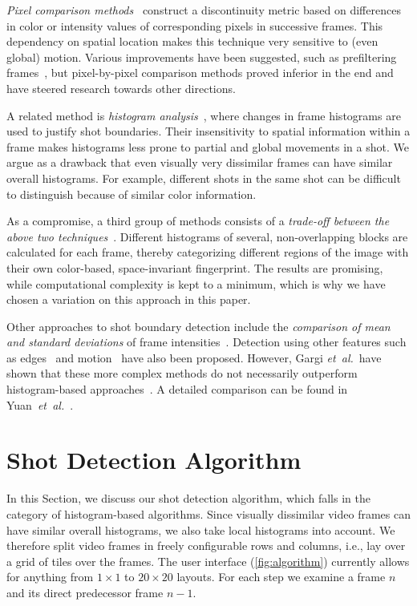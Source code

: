 \documentclass{acm_proc_article-sp}
\begin{document}
\emph{Pixel comparison methods}~\cite{Hampapur1994, Zhang1993} construct a discontinuity metric based on differences in color or intensity values of corresponding pixels in successive frames. This dependency on spatial location makes this technique very sensitive to (even global) motion. Various improvements have been suggested, such as prefiltering frames~\cite{Zhang1995}, but pixel-by-pixel comparison methods proved inferior in the end and have steered research towards other directions.

A related method is \emph{histogram analysis}~\cite{Smeaton1999}, where changes in frame histograms are used to justify shot boundaries. Their insensitivity to spatial information within a frame makes histograms less prone to partial and global movements in a shot. We argue as a drawback that even visually very dissimilar frames can have similar overall histograms. For example, different shots in the same shot can be difficult to distinguish because of similar color information.

As a compromise, a third group of methods consists of a \emph{trade-off between the above two techniques}~\cite{Ahmed1999}. Different histograms of several, non-overlapping blocks are calculated for each frame, thereby categorizing different regions of the image with their own color-based, space-invariant fingerprint. The results are promising, while computational complexity is kept to a minimum, which is why we have chosen a variation on this approach in this paper.

Other approaches to shot boundary detection include the \emph{comparison of mean and standard deviations} of frame intensities~\cite{Lienhart1999}. Detection using other features such as edges~\cite{Zabih1995} and motion~\cite{Bouthemy1997} have also been proposed. However, Gargi \emph{et~al.}\ have shown that these more complex methods do not necessarily outperform histogram-based approaches~\cite{Gargi2000}. A detailed comparison can be found in Yuan~\emph{et~al.}~\cite{Yuan2007}. 

\section{Shot Detection Algorithm} \label{sec:details-of-algo}
In this Section, we discuss our shot detection algorithm, which falls in the category of histogram-based algorithms.  Since visually dissimilar video frames can have similar overall histograms, we also take local histograms into account. 
We therefore split video frames in freely configurable rows and columns, i.e., lay over a grid of tiles over the frames. The user interface (\autoref{fig:algorithm}) currently allows for anything from $\mathit{1} \times \mathit{1}$ to $\mathit{20} \times \mathit{20}$ layouts. For each step we examine a frame $\mathit{n}$ and its direct predecessor frame $\mathit{n - 1}$.
\end{document}
